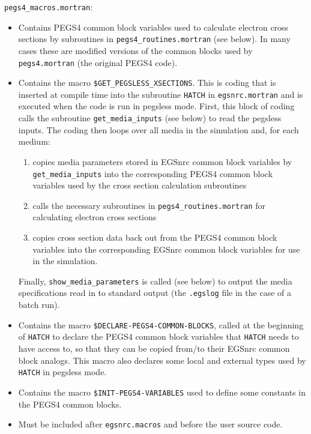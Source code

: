 \begin{description}
\item {\tt pegs4\_macros.mortran}:
\begin{itemize}
\item Contains PEGS4 common block variables used to calculate electron cross sections by subroutines in {\tt pegs4\_routines.mortran}
(see below).  In many cases these are modified versions of the common blocks used by {\tt pegs4.mortran} (the
original PEGS4 code).
\item Contains the macro {\tt \$GET\_PEGSLESS\_XSECTIONS}.  This is coding that is inserted at compile time into
the subroutine {\tt HATCH} in {\tt egsnrc.mortran} and is executed when the code is run in pegsless mode.  First, this
block of coding calls the subroutine {\tt get\_media\_inputs} (see below) to read the pegsless inputs.  The coding then
loops over all media in the simulation and, for each medium:
\begin{enumerate}
\item copies media parameters stored in EGSnrc common block variables by\\
 {\tt get\_media\_inputs} into the corresponding
PEGS4 common block variables used by the cross section calculation subroutines
\item calls the
necessary subroutines in {\tt pegs4\_routines.mortran} for calculating electron cross sections
\item copies cross section data back out from the PEGS4 common block variables into the corresponding EGSnrc common
block variables for use in the simulation.
\end{enumerate}
Finally, {\tt show\_media\_parameters} is called (see below) to output the media specifications read in to standard
output (the {\tt .egslog} file in the case of a batch run).
\item Contains the macro {\tt \$DECLARE-PEGS4-COMMON-BLOCKS}, called at the beginning of {\tt HATCH} to declare the
PEGS4 common block variables that {\tt HATCH} needs to have access to, so that they can be copied from/to their
EGSnrc common block analogs.  This macro also declares some local and external types used by {\tt HATCH} in
pegsless mode.
\item Contains the macro {\tt \$INIT-PEGS4-VARIABLES} used to define some constants in the PEGS4 common blocks.
\item Must be included after {\tt egsnrc.macros} and before the user source code.

\end{itemize}
\end{description}
